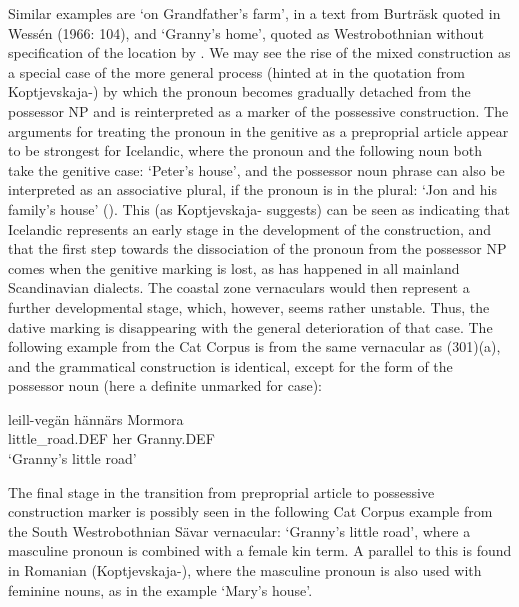 {%
Similar examples are  ‘on Grandfather’s farm’, in a text from Burträsk quoted in Wessén (1966: 104), and  ‘Granny’s home’, quoted as Westrobothnian without specification of the location by \citet[131]{Larsson1929}. We may see the rise of the mixed construction as a special case of the more general process (hinted at in the quotation from Koptjevskaja-\citet{Tamm2003}) by which the pronoun becomes gradually detached from the possessor NP and is reinterpreted as a marker of the possessive construction. The arguments for treating the pronoun in the genitive as a preproprial article appear to be strongest for Icelandic, where the pronoun and the following noun both take the genitive case: ‘Peter’s house’, and the possessor noun phrase can also be interpreted as an associative plural, if the pronoun is in the plural:  ‘Jon and his family’s house’ (\citet[69]{Delsing2003b}). This (as Koptjevskaja-\citet[632]{Tamm2003} suggests) can be seen as indicating that Icelandic represents an early stage in the development of the construction, and that the first step towards the dissociation of the pronoun from the possessor NP comes when the genitive marking is lost, as has happened in all mainland Scandinavian dialects. The coastal zone vernaculars would then represent a further developmental stage, which, however, seems rather unstable. Thus, the dative marking is disappearing with the general deterioration of that case. The following example from the Cat Corpus is from the same vernacular as (301)(a), and the grammatical construction is identical, except for the form of the possessor noun (here a definite unmarked for case): 


\ea\label{}
\gll leill-vegän  hännärs  Mormora\\
little\_road.DEF  her  Granny.DEF\\
\glt ‘Granny’s little road’
\z

 The final stage in the transition from preproprial article to possessive construction marker is possibly seen in the following Cat Corpus example from the South Westrobothnian Sävar vernacular: ‘Granny’s little road’, where a masculine pronoun is combined with a female kin term. A parallel to this is found in Romanian (Koptjevskaja-\citet[632]{Tamm2003}), where the masculine pronoun  is also used with feminine nouns, as in the example  ‘Mary’s house’.

}
